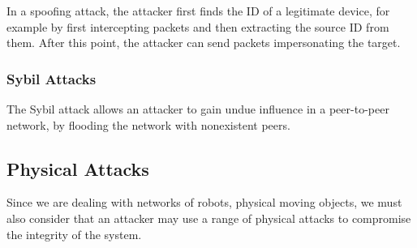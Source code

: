 In a spoofing attack, the attacker first finds the ID of a legitimate device, for example by first intercepting packets and then extracting the source ID from them. After this point, the attacker can send packets impersonating the target.



\subsubsection{Sybil Attacks}
The Sybil attack allows an attacker to gain undue influence in a peer-to-peer network, by flooding the network with nonexistent peers. 


\subsection{Physical Attacks}
Since we are dealing with networks of robots, physical moving objects, we must also consider that an attacker may use a range of physical attacks to compromise the integrity of the system. 
